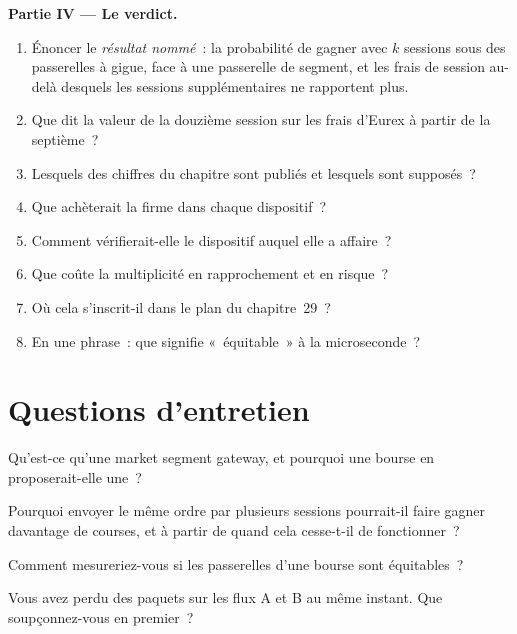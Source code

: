 \begin{problem}
\medskip\noindent\textbf{Partie IV --- Le verdict.}
\begin{enumerate}[resume]
\item Énoncer le \emph{résultat nommé}~: la probabilité de gagner avec $k$ sessions sous des passerelles à gigue, face à une passerelle de segment,
  et les frais de session au-delà desquels les sessions supplémentaires ne rapportent plus.
\item Que dit la valeur de la douzième session sur les frais d'Eurex à partir de la septième~?
\item Lesquels des chiffres du chapitre sont publiés et lesquels sont supposés~?
\item Que achèterait la firme dans chaque dispositif~?
\item Comment vérifierait-elle le dispositif auquel elle a affaire~?
\item Que coûte la multiplicité en rapprochement et en risque~?
\item Où cela s'inscrit-il dans le plan du chapitre~29~?
\item En une phrase~: que signifie «~équitable~» à la microseconde~?
\end{enumerate}
\end{problem}

\section{Questions d'entretien}

\begin{interviewq}\label{iq:nw:futures-connectivity:1}
Qu'est-ce qu'une market segment gateway, et pourquoi une bourse en proposerait-elle une~?
\end{interviewq}

\begin{interviewq}\label{iq:nw:futures-connectivity:2}
Pourquoi envoyer le même ordre par plusieurs sessions pourrait-il faire gagner davantage de courses, et à partir de quand cela cesse-t-il de fonctionner~?
\end{interviewq}

\begin{interviewq}\label{iq:nw:futures-connectivity:3}
Comment mesureriez-vous si les passerelles d'une bourse sont équitables~?
\end{interviewq}

\begin{interviewq}\label{iq:nw:futures-connectivity:4}
Vous avez perdu des paquets sur les flux A et B au même instant. Que soupçonnez-vous en premier~?
\end{interviewq}


